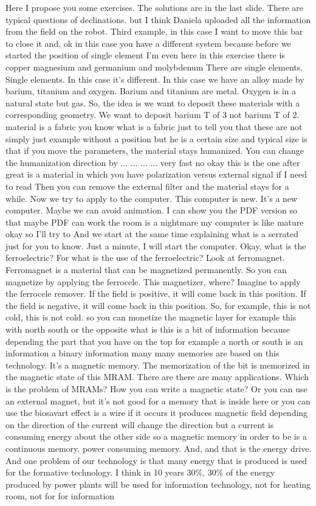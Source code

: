 Here I propose you some exercises. The solutions are in the last slide. There are typical questions of declinations. but I think Daniela uploaded all the information from the field on the robot.
Third example, in this case I want to move this bar to close it and, ok in this case you have a different system because before we started the position of single element I'm even here in this exercise there is copper magnesium and germanium and molybdenum There are single elements. Single elements. In this case it's different. In this case we have an alloy made by barium, titanium and oxygen. Barium and titanium are metal. Oxygen is in a natural state but gas. So, the idea is we want to deposit these materials with a corresponding geometry. We want to deposit barium T of 3 not barium T of 2. material is a fabric you know what is a fabric just to tell you that these are not simply just example without a position but he is a certain size and typical size is that if you move the parameters, the material stays humanized. You can change the humanization direction by ... ... ... ... very fast no okay this is the one after great is a material in which you have polarization versus external signal if I need to read Then you can remove the external filter and the material stays for a while. Now we try to apply to the computer. This computer is new. It's a new computer. Maybe we can avoid animation. I can show you the PDF version so that maybe PDF can work the room is a nightmare my computer is like mature okay so I'll try to And we start at the same time explaining what is a serrated just for you to know. Just a minute, I will start the computer. Okay, what is the ferroelectric? For what is the use of the ferroelectric? Look at ferromagnet. Ferromagnet is a material that can be magnetized permanently. So you can magnetize by applying the ferrocele. This magnetizer, where? Imagine to apply the ferrocele remover. If the field is positive, it will come back in this position. If the field is negative, it will come back in this position. So, for example, this is not cold, this is not cold. so you can monetize the magnetic layer for example this with north south or the opposite what is this is a bit of information because depending the part that you have on the top for example a north or south is an information a binary information many many memories are based on this technology. It's a magnetic memory. The memorization of the bit is memorized in the magnetic state of this MRAM. There are there are many applications. Which is the problem of MRAMs? How you can write a magnetic state? Or you can use an external magnet, but it's not good for a memory that is inside here or you can use the biosavart effect is a wire if it occurs it produces magnetic field depending on the direction of the current will change the direction but a current is consuming energy about the other side so a magnetic memory in order to be is a continuous memory, power consuming memory. And, and that is the energy drive. And one problem of our technology is that many energy that is produced is used for the formative technology. I think in 10 years 30\%, 30\% of the energy produced by power plants will be used for information technology, not for heating room, not for for information 